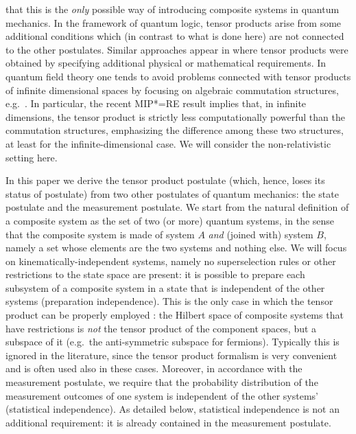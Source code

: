 \documentclass[aps,prl,amsmath,amssymb,twocolumn,nofootinbib]{revtex4}
\theoremstyle{plain}
\theoremstyle{definition}
\theoremstyle{remark}
\begin{document}
	that this is the {\em only} possible way of introducing composite
	systems in quantum mechanics. In the framework of quantum logic,
	tensor products arise from some additional conditions \cite{matolcsi}
	which (in contrast to what is done here) are not connected to the
	other postulates. Similar approaches appear in \cite{marmo,aerts}
	where tensor products were obtained by specifying additional physical
	or mathematical requirements. In quantum field theory one tends to
	avoid problems connected with tensor products of infinite dimensional
	spaces by focusing on algebraic commutation structures,
	e.g.~\cite{giddins,roos}.  In particular, the recent MIP*=RE result
	\cite{mipre} implies that, in infinite dimensions, the tensor product
	is strictly less computationally powerful than the commutation
	structures, emphasizing the difference among these two structures, at
	least for the infinite-dimensional case. We will consider the
	non-relativistic setting here.
	
	In this paper we derive the tensor product postulate (which, hence,
	loses its status of postulate) from two other postulates of quantum
	mechanics: the state postulate and the measurement postulate. We start
	from the natural definition of a composite system as the set of two
	(or more) quantum systems, in the sense that the composite system is
	made of system $A$ {\em and} (joined with) system $B$, namely a set
	whose elements are the two systems and nothing else. We will focus on
	kine\-mati\-cal\-ly-inde\-pen\-dent systems, namely no superselection rules or
	other restrictions to the state space are present: it is possible to
	prepare each subsystem of a composite system in a state that is
	independent of the other systems (preparation independence).  This is
	the only case in which the tensor product can be properly employed
	\cite{susskind,zanardi,zanardilloyd}: the Hilbert space of composite
	systems that have restrictions is {\em not} the tensor product of the
	component spaces, but a subspace of it (e.g.~the anti-symmetric
	subspace for fermions). Typically this is ignored in the literature,
	since the tensor product formalism is very convenient and is often
	used also in these cases. Moreover, in accordance with the measurement
	postulate, we require that the probability distribution of the
	measurement outcomes of one system is independent of the other systems' (statistical
	independence). As detailed below, statistical independence is not an
	additional requirement: it is already contained in the measurement
	postulate.
	
\end{document}
